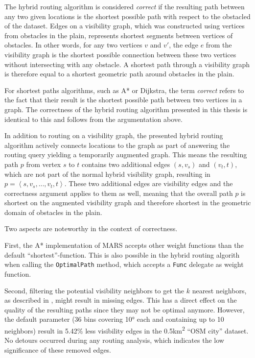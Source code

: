 		The hybrid routing algorithm is considered \emph{correct} if the resulting path between any two given locations is the shortest possible path with respect to the obstacled of the dataset.
		Edges on a visibility graph, which was constructed using vertices from obstacles in the plain, represents shortest segments between vertices of obstacles.
		In other words, for any two vertices $v$ and $v'$, the edge $e$ from the visibility graph is the shortest possible connection between these two vertices without intersecting with any obstacle.
		A shortest path through a visibility graph is therefore equal to a shortest geometric path around obstacles in the plain.
		
		For shortest paths algorithms, such as A* or Dijkstra, the term \emph{correct} refers to the fact that their result is the shortest possible path between two vertices in a graph.
		The correctness of the hybrid routing algorithm presented in this thesis is identical to this and follows from the argumentation above.
		
		In addition to routing on a visibility graph, the presented hybrid routing algorithm actively connects locations to the graph as part of answering the routing query yielding a temporarily augmented graph.
		This means the resulting path $p$ from vertex $s$ to $t$ contains two additional edges $(s, v_s)$ and $(v_t, t)$, which are not part of the normal hybrid visibility graph, resulting in $p=\left\langle s, v_s, ..., v_t, t \right\rangle$.
		These two additional edges are visibility edges and the correctness argument applies to them as well, meaning that the overall path $p$ is shortest on the augmented visibility graph and therefore shortest in the geometric domain of obstacles in the plain.
		
		Two aspects are noteworthy in the context of correctness.
		
		First, the A* implementation of MARS accepts other weight functions than the default \enquote{shortest}-function.
		This is also possible in the hybrid routing algorith when calling the \texttt{OptimalPath} method, which accepts a \texttt{Func} delegate as weight function.
		
		Second, filtering the potential visibility neighbors to get the $k$ nearest neighbors, as described in , might result in missing edges.
		This has a direct effect on the quality of the resulting paths since they may not be optimal anymore.
		However, the default parameter (36 bins covering 10° each and containing up to 10 neighbors) result in 5.42\% less visibility edges in the 0.5km\textsuperscript{2} \enquote{OSM city} dataset.
		No detours occurred during any routing analysis, which indicates the low significance of these removed edges.
		
